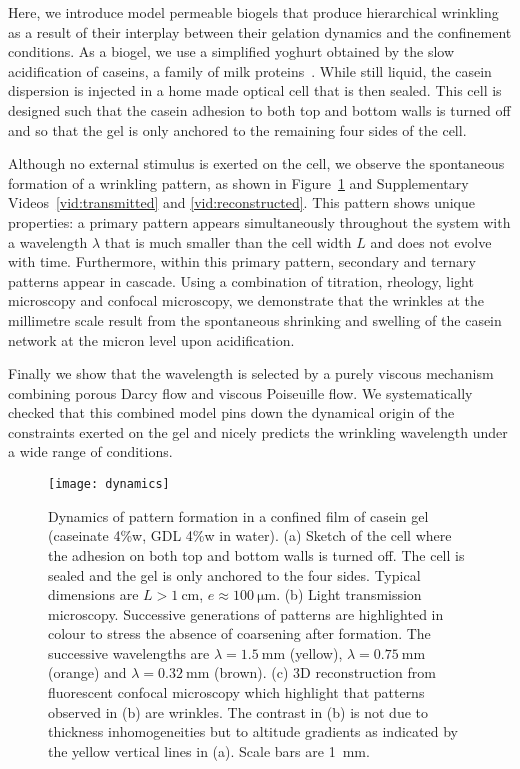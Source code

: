 \documentclass[twocolumn,superscriptaddress,showpacs,preprintnumbers,
amsmath,amssymb,prl]{revtex4-1}
\begin{document}
Here, we introduce model permeable biogels that produce hierarchical wrinkling as a result of their interplay between their gelation dynamics and the confinement conditions. 
As a biogel, we use a simplified yoghurt obtained by the slow acidification of caseins, a family of milk proteins~\cite{Roefs1986,Bremer1989,Lucey1998,Dickinson2002}. While still liquid, the casein dispersion is injected in a home made optical cell that is then sealed. This cell is designed such that the casein adhesion to both top and bottom walls is turned off and so that the gel is only anchored to the remaining four sides of the cell.

Although no external stimulus is exerted on the cell, we observe the spontaneous formation of a wrinkling pattern, as shown in Figure~\ref{fig:dynamics} and Supplementary Videos~\ref{vid:transmitted} and \ref{vid:reconstructed}. This pattern shows unique properties: a primary pattern appears simultaneously throughout the system with a wavelength $\lambda$  that is much smaller than the cell width $L$ and does not evolve with time. Furthermore, within this primary pattern, secondary and ternary patterns appear in cascade.
Using a combination of titration, rheology, light microscopy and confocal microscopy, we demonstrate that the wrinkles at the millimetre scale result from the spontaneous shrinking and swelling of the casein network at the micron level upon acidification.

Finally we show that the wavelength is selected by a purely viscous mechanism combining porous Darcy flow and viscous Poiseuille flow. We systematically checked that this combined model pins down the dynamical origin of the constraints exerted on the gel and nicely predicts the wrinkling wavelength under a wide range of conditions.


\begin{figure}
	\texttt{[image: dynamics]}%
	\caption{Dynamics of pattern formation in a confined film of casein gel (caseinate 4\%w, GDL 4\%w in water). (a) Sketch of the cell where the adhesion on both top and bottom walls is turned off. The cell is sealed and the gel is only anchored to the four sides. Typical dimensions are $L>\SI{1}{\centi\metre}$, $e\approx\SI{100}{\micro\metre}$. (b) Light transmission microscopy. Successive generations of patterns are highlighted in colour to stress the absence of coarsening after formation. The successive wavelengths are $\lambda=\SI{1.5}{\milli\metre}$ (yellow), $\lambda=\SI{0.75}{\milli\metre}$ (orange) and $\lambda=\SI{0.32}{\milli\metre}$ (brown). (c) 3D reconstruction from fluorescent confocal microscopy which highlight that patterns observed in (b) are wrinkles. The contrast in (b) is not due to thickness inhomogeneities but to altitude gradients as indicated by the yellow vertical lines in (a). Scale bars are \SI{1}{\milli\metre}.}%
	\label{fig:dynamics}%
\end{figure}
\end{document}
